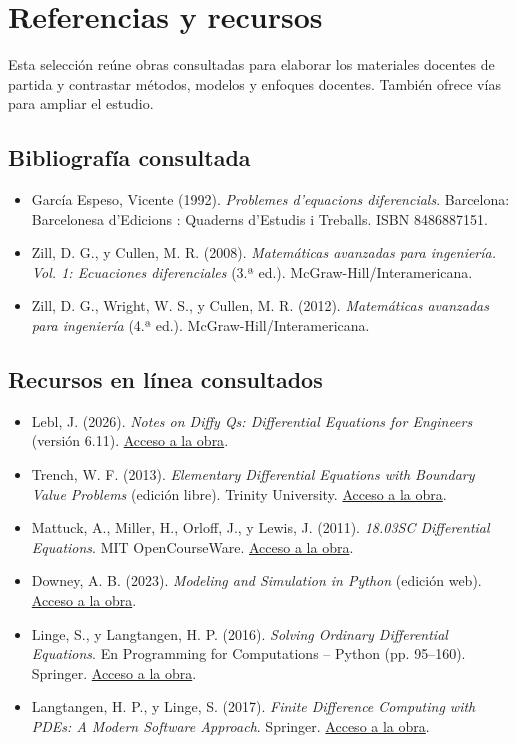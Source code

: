 \chapter*{Referencias y recursos}
Esta selección reúne obras consultadas para elaborar los materiales docentes de partida y contrastar métodos, modelos y enfoques docentes. También ofrece vías para ampliar el estudio.

\section*{Bibliografía consultada}
\begin{itemize}
\item García Espeso, Vicente (1992). \emph{Problemes d’equacions diferencials}. Barcelona: Barcelonesa d’Edicions : Quaderns d’Estudis i Treballs. ISBN 8486887151.
\item Zill, D. G., y Cullen, M. R. (2008). \emph{Matemáticas avanzadas para ingeniería. Vol. 1: Ecuaciones diferenciales} (3.ª ed.). McGraw-Hill/Interamericana.
\item Zill, D. G., Wright, W. S., y Cullen, M. R. (2012). \emph{Matemáticas avanzadas para ingeniería} (4.ª ed.). McGraw-Hill/Interamericana.
\end{itemize}

\section*{Recursos en línea consultados}
\begin{itemize}
\item Lebl, J. (2026). \emph{Notes on Diffy Qs: Differential Equations for Engineers} (versión 6.11). \href{https://www.jirka.org/diffyqs/}{Acceso a la obra}.
\item Trench, W. F. (2013). \emph{Elementary Differential Equations with Boundary Value Problems} (edición libre). Trinity University. \href{https://digitalcommons.trinity.edu/mono/9/}{Acceso a la obra}.
\item Mattuck, A., Miller, H., Orloff, J., y Lewis, J. (2011). \emph{18.03SC Differential Equations}. MIT OpenCourseWare. \href{https://ocw.mit.edu/courses/18-03sc-differential-equations-fall-2011/}{Acceso a la obra}.
\item Downey, A. B. (2023). \emph{Modeling and Simulation in Python} (edición web). \href{https://allendowney.github.io/ModSimPy/}{Acceso a la obra}.
\item Linge, S., y Langtangen, H. P. (2016). \emph{Solving Ordinary Differential Equations}. En Programming for Computations – Python (pp. 95–160). Springer. \href{https://doi.org/10.1007/978-3-319-32428-9_4}{Acceso a la obra}.
\item Langtangen, H. P., y Linge, S. (2017). \emph{Finite Difference Computing with PDEs: A Modern Software Approach}. Springer. \href{https://doi.org/10.1007/978-3-319-55456-3}{Acceso a la obra}.
\end{itemize}
